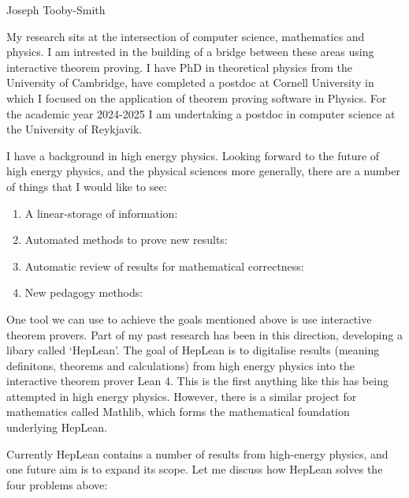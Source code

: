 \documentclass[14pt,letter]{article}
\newcounter{customtitle}
\begin{document}
\vspace{-1cm}
\begin{flushright}
{{\Large \color{white}Joseph Tooby-Smith }}
\end{flushright}
\vspace{0.4cm}

My research sits at the intersection of computer science, 
mathematics and physics.
I am intrested in the building of a bridge between these areas using 
interactive theorem proving. I have PhD in theoretical physics 
from the University of Cambridge, 
have completed a postdoc at Cornell University in which I focused on the 
application of theorem proving software in Physics. For the academic 
year 2024-2025 I am undertaking a postdoc in computer science at the 
University of Reykjavik.

I have a background in high energy physics. Looking forward to the future of high energy physics, and the physical sciences more generally, there are a number of things that I would like to see: 

\begin{enumerate}
\item A linear-storage of information:
\item Automated methods to prove new results:
\item Automatic review of results for mathematical correctness: 
\item New pedagogy methods:	
\end{enumerate}


One tool we can use to achieve the goals mentioned above is use interactive theorem provers. Part of my past research has been in this direction, developing a libary called `HepLean'. The goal of HepLean is to digitalise results 
(meaning definitons, theorems and calculations)
from high energy physics into 
the interactive theorem prover Lean 4. This is the first anything like this has being attempted
in high energy physics. However, there is a similar project for mathematics called Mathlib, which forms the mathematical foundation underlying HepLean.

Currently HepLean contains a number of results from high-energy physics, and one future aim is to expand its scope. Let me discuss how HepLean solves the four problems above: 
\end{document}
